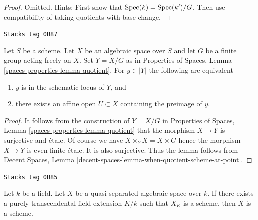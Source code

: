 \begin{proof}
Omitted. Hints: First show that $\operatorname{Spec}(k) = \operatorname{Spec}(k')/G$.
Then use compatibility of taking quotients with base change.
\end{proof}

\begin{lemma}
\label{spaces-over-fields-lemma-when-quotient-scheme-at-point}
\href{https://stacks.math.columbia.edu/tag/0B87}{\texttt{Stacks tag 0B87}}

Let $S$ be a scheme. Let $X$ be an algebraic space over $S$ and
let $G$ be a finite group acting freely on $X$. Set $Y = X/G$ as
in Properties of Spaces, Lemma \ref{spaces-properties-lemma-quotient}.
For $y \in |Y|$ the following are equivalent
\begin{enumerate}
\item $y$ is in the schematic locus of $Y$, and
\item there exists an affine open $U \subset X$
containing the preimage of $y$.
\end{enumerate}
\end{lemma}

\begin{proof}
It follows from the construction of $Y = X/G$ in
Properties of Spaces, Lemma \ref{spaces-properties-lemma-quotient}
that the morphism $X \to Y$ is surjective and \'etale.
Of course we have $X \times_Y X = X \times G$ hence the morphism
$X \to Y$ is even finite \'etale. It is also surjective.
Thus the lemma follows from
Decent Spaces, Lemma \ref{decent-spaces-lemma-when-quotient-scheme-at-point}.
\end{proof}

\begin{lemma}
\label{spaces-over-fields-lemma-scheme-after-purely-transcendental-base-change}
\href{https://stacks.math.columbia.edu/tag/0B85}{\texttt{Stacks tag 0B85}}

Let $k$ be a field. Let $X$ be a quasi-separated
algebraic space over $k$. If there exists a purely transcendental
field extension $K/k$ such that $X_K$ is a scheme, then
$X$ is a scheme.
\end{lemma}

